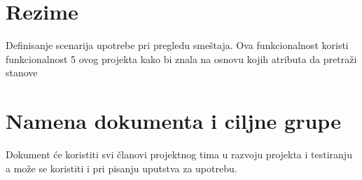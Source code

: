 \section{Rezime}
Definisanje scenarija upotrebe pri pregledu smeštaja. Ova funkcionalnost koristi funkcionalnost 5 ovog projekta kako bi znala na osnovu kojih atributa da pretraži stanove
\section{Namena dokumenta i ciljne grupe}
Dokument će koristiti svi članovi projektnog tima u razvoju projekta i testiranju a može se koristiti i pri pisanju uputstva za upotrebu.